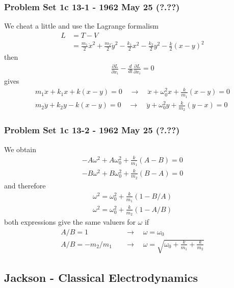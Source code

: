 \documentclass[10pt,a4paper]{article}
\theoremstyle{definition}
\begin{document}
\subsubsection{Problem Set 1c 13-1 - 1962 May 25 (?.??)}
We cheat a little and use the Lagrange formalism 
\begin{align}
L&=T-V\\
&=\frac{m_1}{2}\dot{x}^2+\frac{m_2}{2}\dot{y}^2-\frac{k_1}{2}x^2-\frac{k_2}{2}y^2-\frac{k}{2}(x-y)^2
\end{align}
then
\begin{align}
\frac{\partial L}{\partial x_i}-\frac{d}{dt}\frac{\partial L}{\partial\dot{x}_i}=0
\end{align}
gives
\begin{align}
m_1\ddot{x}+k_1x+k(x-y)=0\quad\rightarrow\quad \ddot{x}+\omega_0^2x+\frac{k}{m_1}(x-y)=0\\
m_2\ddot{y}+k_2y-k(x-y)=0\quad\rightarrow\quad \ddot{y}+\omega_0^2y+\frac{k}{m_2}(y-x)=0
\end{align}


\subsubsection{Problem Set 1c  13-2 - 1962 May 25 (?.??)}
We obtain
\begin{align}
-A\omega^2+A\omega_0^2+\frac{k}{m_1}(A-B)=0\\
-B\omega^2+B\omega_0^2+\frac{k}{m_2}(B-A)=0
\end{align}
and therefore
\begin{align}
\omega^2=\omega_0^2+\frac{k}{m_1}(1-B/A)\\
\omega^2=\omega_0^2+\frac{k}{m_2}(1-A/B)
\end{align}
both expressions give the same valuers for $\omega$ if
\begin{align}
A/B=1\quad&\rightarrow\quad \omega=\omega_0\\
A/B=-m_2/m_1\quad&\rightarrow\quad \omega=\sqrt{\omega_0+\frac{k}{m_1}+\frac{k}{m_2}}
\end{align} 

\subsection{{\sc Jackson} - Classical Electrodynamics}
\end{document}

